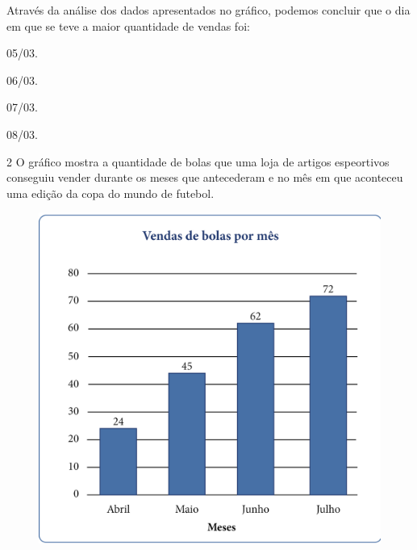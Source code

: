 Através da análise dos dados apresentados no gráfico, podemos concluir
que o dia em que se teve a maior quantidade de vendas foi:

\begin{minipage}{.5\textwidth}
\begin{escolha}
\item
  05/03.
\item
  06/03.
\item
  07/03.
\item
  08/03.
\end{escolha}
\end{minipage}

\pagebreak
\num{2} O gráfico mostra a quantidade de bolas que uma loja de
artigos espeortivos conseguiu vender durante os meses que antecederam e no mês em que aconteceu uma edição da copa do mundo de futebol.

\begin{figure}[htpb!]
\centering
\includegraphics[width=\textwidth]{../ilustracoes/MAT5/SAEB_5ANO_MAT_figura65.png}
\end{figure}

